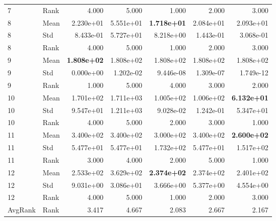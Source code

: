 \begin{table}[t]
\begin{tabular}{llrrrrr}
7 & Rank & 4.000 & 5.000 & 1.000 & 2.000 & 3.000 \\
8 & Mean & 2.230e+01 & 5.551e+01 & \textbf{1.718e+01} & 2.084e+01 & 2.093e+01 \\
8 & Std & 8.433e-01 & 5.727e+01 & 8.218e+00 & 1.443e-01 & 3.068e-01 \\
8 & Rank & 4.000 & 5.000 & 1.000 & 2.000 & 3.000 \\
9 & Mean & \textbf{1.808e+02} & 1.808e+02 & 1.808e+02 & 1.808e+02 & 1.808e+02 \\
9 & Std & 0.000e+00 & 1.202e-02 & 9.446e-08 & 1.309e-07 & 1.749e-12 \\
9 & Rank & 1.000 & 5.000 & 4.000 & 3.000 & 2.000 \\
10 & Mean & 1.701e+02 & 1.711e+03 & 1.005e+02 & 1.006e+02 & \textbf{6.132e+01} \\
10 & Std & 9.547e+01 & 1.211e+03 & 9.028e-02 & 1.242e-01 & 5.347e+01 \\
10 & Rank & 4.000 & 5.000 & 2.000 & 3.000 & 1.000 \\
11 & Mean & 3.400e+02 & 3.400e+02 & 3.000e+02 & 3.400e+02 & \textbf{2.600e+02} \\
11 & Std & 5.477e+01 & 5.477e+01 & 1.732e+02 & 5.477e+01 & 1.517e+02 \\
11 & Rank & 3.000 & 4.000 & 2.000 & 5.000 & 1.000 \\
12 & Mean & 2.533e+02 & 3.629e+02 & \textbf{2.374e+02} & 2.374e+02 & 2.401e+02 \\
12 & Std & 9.031e+00 & 3.086e+01 & 3.666e+00 & 5.377e+00 & 4.554e+00 \\
12 & Rank & 4.000 & 5.000 & 1.000 & 2.000 & 3.000 \\
AvgRank & Rank & 3.417 & 4.667 & 2.083 & 2.667 & 2.167 \\
\hline
\end{tabular}
\end{table}
